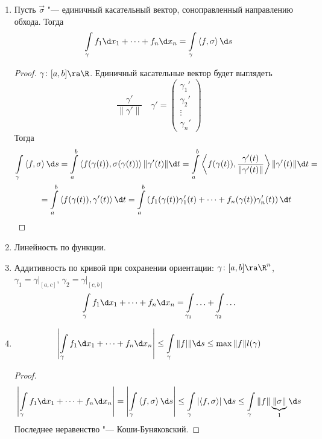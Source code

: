\begin{enumerate}
\item
	Пусть $\vec\sigma$ "--- единичный касательный вектор, соноправленный направлению обхода.
	Тогда
	\[ \int\limits_\gamma f_1 \d x_1 + \dots + f_n \d x_n = \int\limits_\gamma \left<f, \sigma\right> \d s \]
	\begin{proof}
		$\gamma\colon[a, b] \ra \R$.
		Единичный касательные вектор будет выглядеть
		\[ \frac{\gamma'}{\|\gamma'\|} \quad \gamma' = \begin{pmatrix} \gamma_1' \\ \gamma_2' \\ \vdots \\ \gamma_n' \end{pmatrix} \]
		Тогда
		\begin{gather*}
			\int\limits_\gamma \left<f, \sigma\right> \d s
			= \int\limits_a^b \left<f(\gamma(t)), \sigma(\gamma(t))\right> \|\gamma'(t)\| \d t 
			= \int\limits_a^b \left<f(\gamma(t)), \frac{\gamma'(t)}{\|\gamma'(t)\|}\right> \|\gamma'(t)\| \d t = \\
			= \int\limits_a^b \left<f(\gamma(t)), \gamma'(t)\right> \d t
			= \int\limits_a^b \left(f_1(\gamma(t))\gamma'_1(t) + \dots + f_n(\gamma(t))\gamma'_n(t) \right) \d t
		\end{gather*}
	\end{proof}

\item
	Линейность по функции.

\item
	Аддитивность по кривой при сохранении ориентации: $\gamma\colon[a, b] \ra \R^n$, $\gamma_1 = \gamma\bigr|_{[a,c]}$, $\gamma_2 = \gamma\bigr|_{[c, b]}$
	\[ \int\limits_\gamma f_1 \d x_1 + \dots + f_n \d x_n = \int\limits_{\gamma_1} \ldots + \int\limits_{\gamma_2} \ldots \]

\item
	\[ \left| \int\limits_\gamma f_1 \d x_1 + \dots + f_n \d x_n \right| \le \int\limits_\gamma \|f|\| \d s \le \max \|f\| l(\gamma) \]
	\begin{proof}
		\begin{gather*}
			\left| \int\limits_\gamma f_1 \d x_1 + \dots + f_n \d x_n \right|
			= \left| \int\limits_\gamma \left<f, \sigma\right> \d s \right|
			\le \int\limits_\gamma \left|\left<f, \sigma\right>\right| \d s
			\le \int\limits_\gamma \|f\| \underbrace{\|\sigma\|}_1 \d s
		\end{gather*}
		Последнее неравенство "--- Коши-Буняковский.
	\end{proof}


\end{enumerate}
